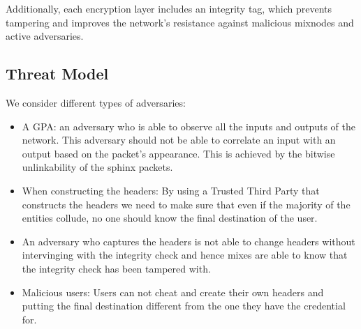 Additionally, each encryption layer includes an integrity tag, which prevents tampering and improves the network’s resistance against malicious mixnodes and active adversaries.

\subsection{Threat Model} 
We consider different types of adversaries:
\begin{itemize}
	\item A GPA: an adversary who is able to observe all the inputs and outputs of the network. This adversary should not be able to correlate an input with an output based on the packet's appearance. This is achieved by the bitwise unlinkability of the sphinx packets.
	\item When constructing the headers: By using a Trusted Third Party that constructs the headers we need to make sure that even if the majority of the entities collude, no one should know the final destination of the user.
	\item An adversary who captures the headers is not able to change headers without intervinging with the integrity check and hence mixes are able to know that the integrity check has been tampered with.
	\item Malicious users: Users can not cheat and create their own headers and putting the final destination different from the one they have the credential for.
\end{itemize}